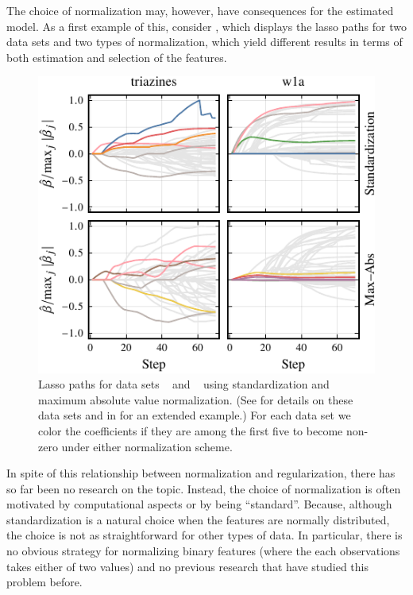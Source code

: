 The choice of normalization may, however, have consequences for the estimated model. As a
first example of this, consider , which displays the lasso paths
for two data sets and two types of normalization, which yield different results in terms of
both estimation and selection of the features.

\begin{figure}[bpt]
  \centering
  \includegraphics[]{plots/realdata_paths_small.pdf}
  \caption{%
    Lasso paths for data sets ~\citep{king} and
    ~\citep{platt1998} using standardization and maximum absolute
    value normalization. (See  for details
    on these data sets and  in
     for an extended example.) For each data
    set we color the coefficients if they are among the first five to become
    non-zero under either normalization scheme.
  }
  \label{fig:realdata-paths}
\end{figure}

In spite of this relationship between normalization and regularization, there has so far
been no research on the topic. Instead, the choice of normalization is often motivated by
computational aspects or by being ``standard''. Because, although standardization is a
natural choice when the features are normally distributed, the choice is not as
straightforward for other types of data. In particular, there is no obvious strategy for
normalizing binary features (where the each observations takes either of two values) and no
previous research that have studied this problem before.

